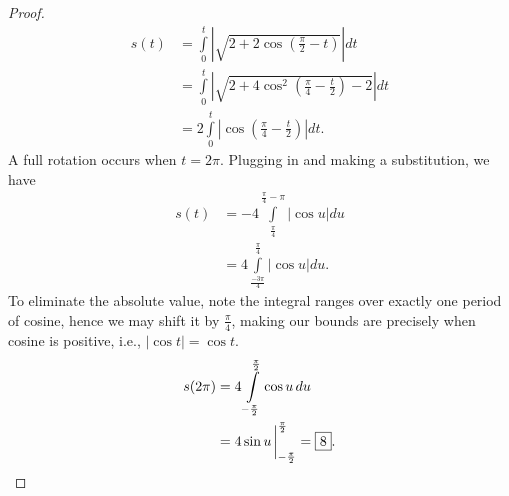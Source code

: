 \documentclass[12pt]{article}
\newenvironment{problem}[2][Problem]{\begin{trivlist}
    \item[\hskip \labelsep {\bfseries #1}\hskip \labelsep {\bfseries #2.}]}{\end{trivlist}}
\theoremstyle{definition}
\begin{document}
\begin{problem}{1.3.2}
\begin{enumerate}[label=(\alph*)]
\begin{proof}
\begin{align}
				      \label{eq:10}
				      s(t) & = \int\limits_0^t \left| \sqrt{2 + 2\cos(\frac{\pi}{2} - t)} \right| dt                 \\
				           & = \int\limits_0^t \left| \sqrt{2 + 4\cos^2(\frac{\pi}{4} - \frac{t}{2}) - 2} \right| dt \\
				           & = 2\int\limits_0^t \left| \cos(\frac{\pi}{4} - \frac{t}{2}) \right| dt.
			      \end{align}
			      A full rotation occurs when \( t = 2\pi \).
			      Plugging in and making a substitution, we have
			      \begin{align}
				      \label{eq:11}
				      s(t) & = -4\int\limits_{\frac{\pi}{4}}^{\frac{\pi}{4} - \pi} \left| \cos u \right| du \\
				           & = 4 \int\limits_{\frac{-3\pi}{4}}^{\frac{\pi}{4}} \left| \cos u \right| du.
			      \end{align}
			      To eliminate the absolute value, note the integral ranges over exactly one period of cosine, hence we may shift it by \( \frac{\pi}{4} \), making our bounds are precisely when cosine is positive, i.e., \( \left| \cos t \right| = \cos t\).
			      \begin{align}
				      \label{eq:14}
				      s(2\pi) & = 4 \int\limits_{- \frac{\pi}{2}}^{\frac{\pi}{2}} \cos u \,du     \\
				              & = 4 \sin u \eval_{-\frac{\pi}{2}}^{\frac{\pi}{2}}            = \boxed{8}.
			      \end{align}
		      \end{proof}
	\end{enumerate}
\end{problem}
\end{document}
